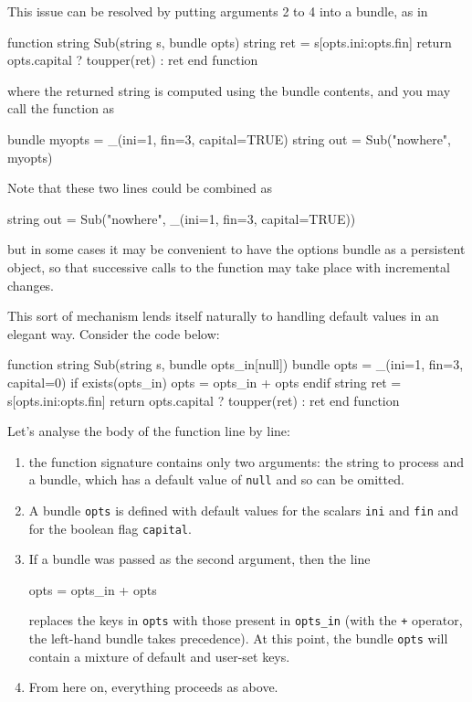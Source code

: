 This issue can be resolved by putting arguments 2 to 4 into a bundle, as in
\begin{code}
function string Sub(string s, bundle opts)
    string ret = s[opts.ini:opts.fin]
    return opts.capital ? toupper(ret) : ret
end function
\end{code}
where the returned string is computed using the bundle contents, and you may
call the function as
\begin{code}
  bundle myopts = _(ini=1, fin=3, capital=TRUE)
  string out = Sub("nowhere", myopts)
\end{code}
Note that these two lines could be combined as
\begin{code}
  string out = Sub("nowhere", _(ini=1, fin=3, capital=TRUE))
\end{code}
but in some cases it may be convenient to have the options bundle as a
persistent object, so that successive calls to the function may take
place with incremental changes.

This sort of mechanism lends itself naturally to handling default values in
an elegant way. Consider the code below:
\begin{code}
function string Sub(string s, bundle opts_in[null])
    bundle opts = _(ini=1, fin=3, capital=0)
    if exists(opts_in)
        opts = opts_in + opts
    endif
    string ret = s[opts.ini:opts.fin]
    return opts.capital ? toupper(ret) : ret
end function
\end{code}
Let's analyse the body of the function line by line:
\begin{enumerate}
\item the function signature contains only two arguments: the string
  to process and a bundle, which has a default value of \texttt{null}
  and so can be omitted.
\item A bundle \texttt{opts} is defined with default values for the scalars
  \texttt{ini} and \texttt{fin} and for the boolean flag \texttt{capital}.
\item If a bundle was passed as the second argument, then the line
  \begin{code}
     opts = opts_in + opts
  \end{code}
  replaces the keys in \texttt{opts} with those present in
  \texttt{opts\_in} (with the \texttt{+} operator, the left-hand
  bundle takes precedence). At this point, the bundle \texttt{opts}
  will contain a mixture of default and user-set keys.
\item From here on, everything proceeds as above.
\end{enumerate}

